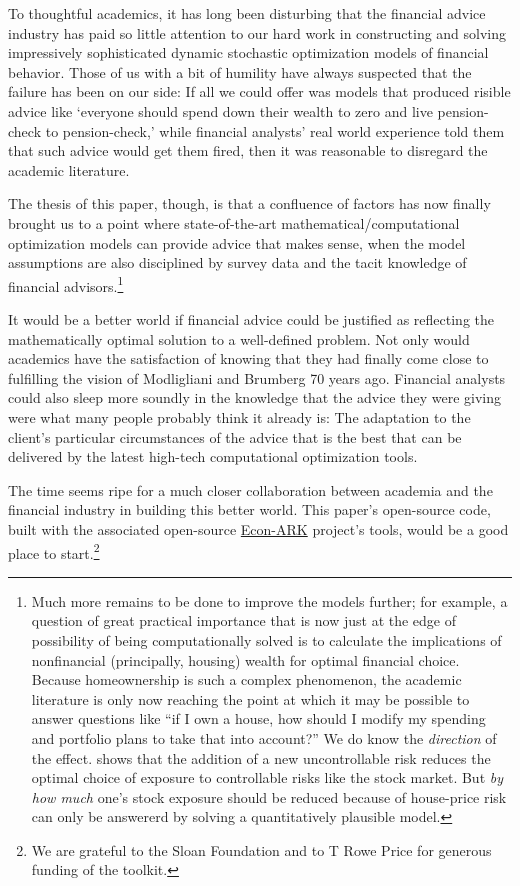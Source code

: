 \documentclass{article}
\begin{document}
To thoughtful academics, it has long been disturbing that the financial advice industry has paid so little attention to our hard work in constructing and solving impressively sophisticated dynamic stochastic optimization models of financial behavior. Those of us with a bit of humility have always suspected that the failure has been on our side: If all we could offer was models that produced risible advice like `everyone should spend down their wealth to zero and live pension-check to pension-check,' while financial analysts' real world experience told them that such advice would get them fired, then it was reasonable to disregard the academic literature.

The thesis of this paper, though, is that a confluence of factors has now finally brought us to a point where state-of-the-art mathematical/computational optimization models can provide advice that makes sense, when the model assumptions are also disciplined by survey data and the tacit knowledge of financial advisors.\footnote{Much more remains to be done to improve the models further; for example, a question of great practical importance that is now just at the edge of possibility of being computationally solved is to calculate the implications of nonfinancial (principally, housing) wealth for optimal financial choice. Because homeownership is such a complex phenomenon, the academic literature is only now reaching the point at which it may be possible to answer questions like ``if I own a house, how should I modify my spending and portfolio plans to take that into account?'' We do know the \textit{direction} of the effect. \cite{kimballStandardRA} shows that the addition of a new uncontrollable risk reduces the optimal choice of exposure to controllable risks like the stock market. But \textit{by how much} one's stock exposure should be reduced because of house-price risk can only be answererd by solving a quantitatively plausible model.}

It would be a better world if financial advice could be justified as reflecting the mathematically optimal solution to a well-defined problem.  Not only would academics have the satisfaction of knowing that they had finally come close to fulfilling the vision of Modligliani and Brumberg 70 years ago. Financial analysts could also sleep more soundly in the knowledge that the advice they were giving were what many people probably think it already is: The adaptation to the client's particular circumstances of the advice that is the best that can be delivered by the latest high-tech computational optimization tools.

The time seems ripe for a much closer collaboration between academia and the financial industry in building this better world.  This paper's open-source code, built with the associated open-source \href{https://econ-ark.org}{Econ-ARK} project's tools, would be a good place to start.\footnote{We are grateful to the Sloan Foundation and to T Rowe Price for generous funding of the toolkit.}





\end{document}
